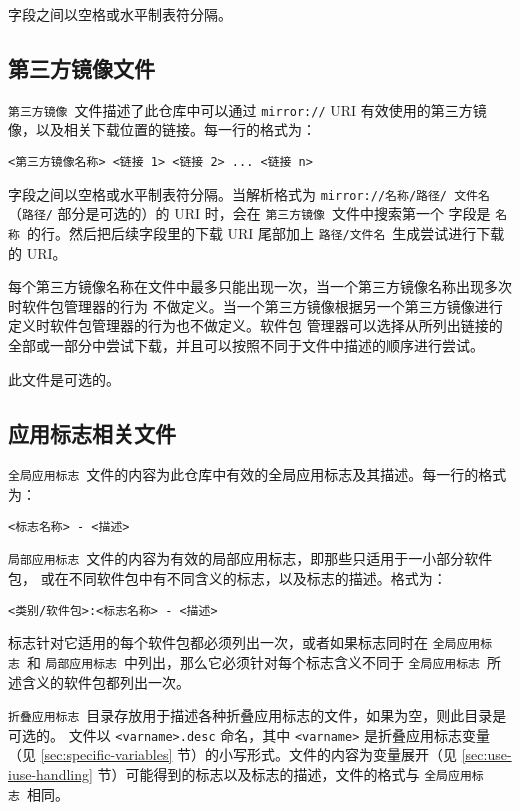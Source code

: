 字段之间以空格或水平制表符分隔。

\subsection{第三方镜像文件}
\label{sec:thirdpartymirrors}
\texttt{第三方镜像}\ 文件描述了此仓库中可以通过 \texttt{mirror://} URI
有效使用的第三方镜像，以及相关下载位置的链接。每一行的格式为：
\begin{verbatim}
<第三方镜像名称> <链接 1> <链接 2> ... <链接 n>
\end{verbatim}
字段之间以空格或水平制表符分隔。当解析格式为 \texttt{mirror:/\slash 名称\slash 路径\slash
文件名}（\texttt{路径/} 部分是可选的）的 URI 时，会在 \texttt{第三方镜像}\ 文件中搜索第一个
字段是 \texttt{名称}\ 的行。然后把后续字段里的下载 URI 尾部加上 \texttt{路径\slash 文件名}\
生成尝试进行下载的 URI。

每个第三方镜像名称在文件中最多只能出现一次，当一个第三方镜像名称出现多次时软件包管理器的行为
不做定义。当一个第三方镜像根据另一个第三方镜像进行定义时软件包管理器的行为也不做定义。软件包
管理器可以选择从所列出链接的全部或一部分中尝试下载，并且可以按照不同于文件中描述的顺序进行尝试。

此文件是可选的。

\subsection{应用标志相关文件}
\label{sec:use.desc}
\texttt{全局应用标志}\ 文件的内容为此仓库中有效的全局应用标志及其描述。每一行的格式为：
\begin{verbatim}
<标志名称> - <描述>
\end{verbatim}

\texttt{局部应用标志}\ 文件的内容为有效的局部应用标志，即那些只适用于一小部分软件包，
或在不同软件包中有不同含义的标志，以及标志的描述。格式为：
\begin{verbatim}
<类别/软件包>:<标志名称> - <描述>
\end{verbatim}
标志针对它适用的每个软件包都必须列出一次，或者如果标志同时在 \texttt{全局应用标志}\ 和
\texttt{局部应用标志}\ 中列出，那么它必须针对每个标志含义不同于 \texttt{全局应用标志}\
所述含义的软件包都列出一次。

\texttt{折叠应用标志}\ 目录存放用于描述各种折叠应用标志的文件，如果为空，则此目录是可选的。
文件以 \texttt{<varname>.desc} 命名，其中 \texttt{<varname>} 是折叠应用标志变量（见
\ref{sec:specific-variables} 节）的小写形式。文件的内容为变量展开（见 \ref{sec:use-iuse-handling}
节）可能得到的标志以及标志的描述，文件的格式与 \texttt{全局应用标志}\ 相同。

